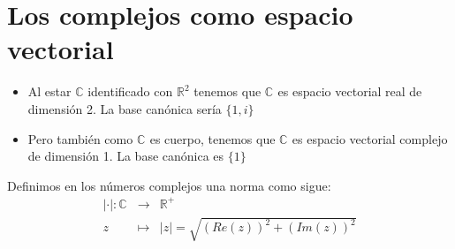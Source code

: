 \section{Los complejos como espacio vectorial}

\begin{itemize}
  \item Al estar \(\mathbb{C}\) identificado con \(\mathbb{R}^{2}\) tenemos que \(\mathbb{C}^{}\) es espacio vectorial real de dimensión 2.
  La base canónica sería \(\{1,i\}\)
  \item Pero también como \(\mathbb{C}^{}\) es cuerpo, tenemos que \(\mathbb{C}^{}\) es espacio vectorial complejo de dimensión 1.
  La base canónica es \(\{1\}\)
\end{itemize}

\begin{definicion}[Norma]
  Definimos en los números complejos una norma como sigue:
  \begin{eqnarray*}
    |\cdot| : \mathbb{C}^{ } & \rightarrow & \mathbb{R}^{+} \\
                           z & \mapsto & |z|=\sqrt{(Re(z))^2+(Im(z))^2}
  \end{eqnarray*}
\end{definicion}

